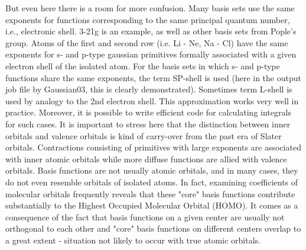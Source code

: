 But even here there is a room for more confusion. Many basis sets use
the same exponents for functions corresponding to the same principal
quantum number, i.e., electronic shell. 3-21g is an example, as well
as other basis sets from Pople's group. Atoms of the first and second
row (i.e. Li - Ne, Na - Cl) have the same exponents for s- and p-type
gaussian primitives formally associated with a given electron shell of
the isolated atom. For the basis sets in which s- and p-type functions
share the same exponents, the term SP-shell is used (here in the
output job file by Gaussian03, this is clearly
demonstrated). Sometimes term L-shell is used by analogy to the 2nd
electron shell. This approximation works very well in
practice. Moreover, it is possible to write efficient code for
calculating integrals for such cases. It is important to stress here
that the distinction between inner orbitals and valence orbitals is
kind of carry-over from the past era of Slater orbitals.  Contractions
consisting of primitives with large exponents are associated with
inner atomic orbitals while more diffuse functions are allied with
valence orbitals. Basis functions are not usually atomic orbitals, and
in many cases, they do not even resemble orbitals of isolated
atoms. In fact, examining coefficients of molecular orbitals
frequently reveals that these "core" basis functions contribute
substantially to the Highest Occupied Molecular Orbital (HOMO). It
comes as a consequence of the fact that basis functions on a given
center are usually not orthogonal to each other and "core" basis
functions on different centers overlap to a great extent - situation
not likely to occur with true atomic orbitals.

